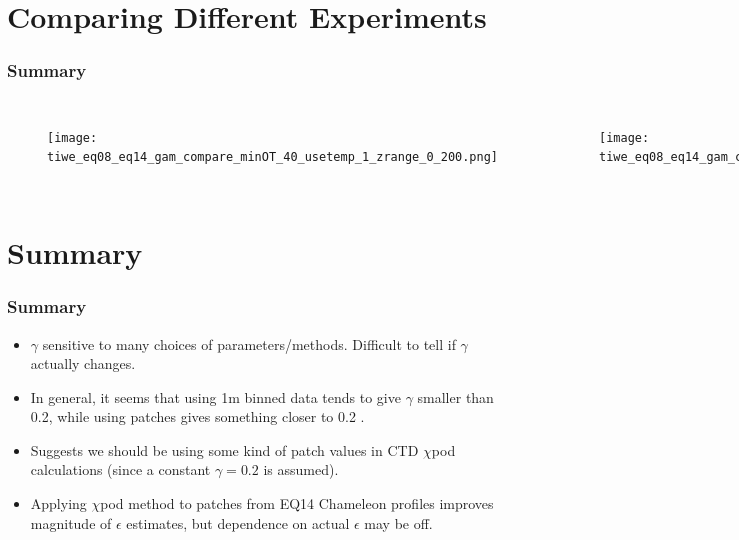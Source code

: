 \documentclass{beamer}
\begin{document}
\section{Comparing Different Experiments}

\begin{frame}
 \frametitle{ Summary}


\begin{columns}



 \begin{figure}[htbp]
\begin{center}
\texttt{[image: tiwe\_eq08\_eq14\_gam\_compare\_minOT\_40\_usetemp\_1\_zrange\_0\_200.png]}
\caption{}
\label{default}
\end{center}
\end{figure}



 \begin{figure}[htbp]
\begin{center}
\texttt{[image: tiwe\_eq08\_eq14\_gam\_compare\_minOT\_40\_usetemp\_1\_zrange\_80\_200.png]}
\caption{}
\label{default}
\end{center}
\end{figure}

\end{columns}

\end{frame}


\section{Summary}

\begin{frame}
 \frametitle{ Summary}

\begin{itemize}
\item $\gamma$ sensitive to many choices of parameters/methods. Difficult to tell if $\gamma$ actually changes.
\item In general, it seems that using 1m binned data tends to give $\gamma$ smaller than 0.2, while using patches gives something closer to 0.2 . 
\item Suggests we should be using some kind of patch values in CTD $\chi$pod calculations (since a constant $\gamma=0.2$ is assumed).
\item Applying $\chi$pod method to patches from EQ14 Chameleon profiles improves magnitude of $\epsilon$ estimates, but dependence on actual $\epsilon$ may be off.
\end{itemize}

\end{frame}



\end{document}
